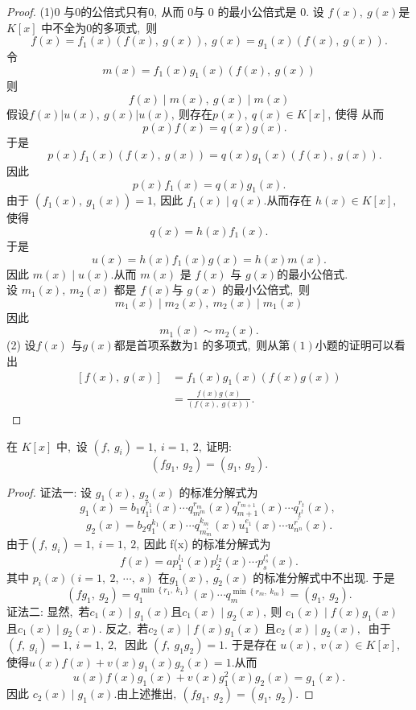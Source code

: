 \begin{proof}
	(1)$ 0$ 与$ 0 $的公倍式只有$ 0 ,\ $从而 $0 $与 $0$ 的最小公倍式是 $0 .$
	设 $ f(x),\  g(x)  $是  $K[x] $ 中不全为$ 0 $的多项式,\  则
	$$f(x)=f_1(x)(f(x),\ g(x)),\ g(x)=g_1(x)(f(x),\ g(x)).$$
	令
	$$m(x)=f_1(x)g_1(x)(f(x),\ g(x))$$
	则
	$$f(x)\mid m(x),\ g(x)\mid m(x)$$
	假设$  f(x)|u(x),\  g(x)| u(x) ,\  $则存在$  p(x),\  q(x) \in K[x] ,\  $使得
	从而  
	$$\quad p(x) f(x)=q(x) g(x) .$$
	于是  	
	$$\quad p(x) f_{1}(x)(f(x),\  g(x))=q(x) g_{1}(x)(f(x),\  g(x)) .$$
	因此  
	$$p(x) f_{1}(x)=q(x) g_{1}(x) .$$
	由于  $\left(f_{1}(x),\  g_{1}(x)\right)=1 ,\  $因此 $ f_{1}(x) \mid q(x)  .$从而存在 $ h(x) \in K[x] ,\ $ 使得
	$$q(x)=h(x) f_{1}(x) .$$
	于是
	$$u(x)=h(x) f_{1}(x) g(x)=h(x) m(x) .$$
	因此  $m(x) \mid u(x)  .$从而 $ m(x) $ 是  $f(x) $ 与 $ g(x)  $的最小公倍式.\\
	设 $ m_{1}(x),\  m_{2}(x) $ 都是  $f(x)  $与  $g(x) $ 的最小公倍式,\  则
	$$m_1(x)\mid m_2(x),\ m_2(x)\mid m_1(x)$$
	因此 $$ m_{1}(x) \sim m_{2}(x) .$$
	(2) 设$  f(x) $ 与$  g(x)  $都是首项系数为$ 1$ 的多项式,\  则从第$ (1) $小题的证明可以看出
	$$\begin{aligned}
		{[f(x),\  g(x)] } & =f_{1}(x) g_{1}(x)(f(x) g(x)) \\
		& =\frac{f(x) g(x)}{(f(x),\  g(x))} .
	\end{aligned}$$
\end{proof}
\newpage
\begin{problem}
	在 $ K[x] $ 中,\  设 $ \left(f,\  g_{i}\right)=1,\  i=1,\ 2 ,\  $证明:
	$$\left(f g_{1},\  g_{2}\right)=\left(g_{1},\  g_{2}\right).$$
\end{problem}	
\begin{proof}
	证法一: 设  $g_{1}(x),\  g_{2}(x) $ 的标准分解式为
	$$g_{1}(x)=b_{1} q_{1^{1}}^{r_{1}}(x) \cdots q_{m^{m}}^{r_{m}}(x) q_{m+1}^{r_{m+1}}(x) \cdots q_{t^{t}}^{r_{t}}(x),\ $$
	$$g_{2}(x)=b_{2} q_{1}^{k_{1}}(x) \cdots q_{m_{m}^{\prime}}^{k_{m}}(x) u_{1}^{e_{1}}(x) \cdots u_{n^{n}}^{r^{\prime}}(x) .$$
	由于$  \left(f,\  g_{i}\right)=1,\  i=1,\ 2 ,\  $因此  f(x)  的标准分解式为
	$$f(x)=a p_{1}^{l_{1}}(x) p_{2}^{l_{2}}(x) \cdots p_{s}^{l_{s}^{s}}(x) .$$
	其中 $ p_{i}(x)(i=1,\ 2,\  \cdots,\  s) $ 在$  g_{1}(x),\  g_{2}(x) $ 的标准分解式中不出现. 于是
	$$\left(f g_{1},\  g_{2}\right)=q_{1}^{\min \left\{r_{1},\  k_{1}\right\}}(x) \cdots q_{m}^{\min \left\{r_{m},\  k_{m}\right\}}=\left(g_{1},\  g_{2}\right) .$$
	证法二: 显然,\  若$  c_{1}(x) \mid g_{1}(x)  $$且  c_{1}(x) \mid g_{2}(x) ,\  $则 $ c_{1}(x) \mid f(x) g_{1}(x) $ 且$  c_{1}(x) \mid g_{2}(x)  .$ 反之,\  若$  c_{2}(x) \mid f(x) g_{1}(x) $ 且$  c_{2}(x) \mid g_{2}(x) ,\ $ 由于 $ \left(f,\  g_{i}\right)=1,\  i=1,\ 2 ,\ $ 因此 $ \left(f,\  g_{1} g_{2}\right)=1  .$ 于是存在 $ u(x),\  v(x) \in K[x] ,\ $ 使得$  u(x) f(x)+v(x) g_{1}(x) g_{2}(x)=1  .$从而
	$$u(x) f(x) g_{1}(x)+v(x) g_{1}^{2}(x) g_{2}(x)=g_{1}(x) .$$
	因此 $ c_{2}(x) \mid g_{1}(x)  .$由上述推出$,\   \left(f g_{1},\  g_{2}\right)=\left(g_{1},\  g_{2}\right)  .$
\end{proof}

